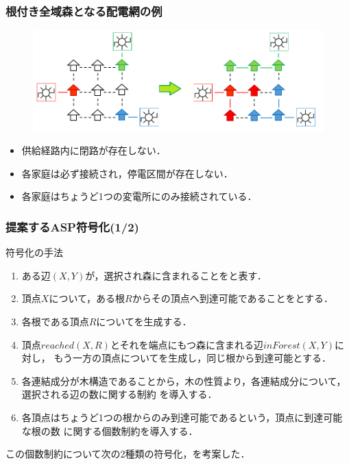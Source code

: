\documentclass[dvipdfmx,11pt]{beamer}
\begin{document}
\begin{frame}\frametitle{根付き全域森となる配電網の例}

 \begin{figure}[h]
  \centering
  \includegraphics[scale=0.5]{network.png}
 \end{figure}

 \begin{exampleblock}{}
  \begin{itemize}
   \item 供給経路内に閉路が存在しない．
   \item 各家庭は必ず接続され，停電区間が存在しない．
   \item 各家庭はちょうど1つの変電所にのみ接続されている．
  \end{itemize}
 \end{exampleblock}
\end{frame}

\begin{frame}\frametitle{提案するASP符号化(1/2)}
 \begin{exampleblock}{符号化の手法}
  \begin{enumerate}
   \item  ある辺$(X,Y)$が，選択され森に含まれることをと表す．
   \item  頂点$X$について，ある根$R$からその頂点へ到達可能であることをとする．
   \item  各根である頂点$R$についてを生成する．
   \item  頂点$reached(X,R)$とそれを端点にもつ森に含まれる辺$inForest(X,Y)$に対し，
		  もう一方の頂点についてを生成し，同じ根から到達可能とする．
   \item  各連結成分が木構造であることから，木の性質より，各連結成分について，
		  選択される\alert{辺の数に関する制約} を導入する．
   \item  各頂点はちょうど1つの根からのみ到達可能であるという，頂点に到達可能な\alert{根の数
		  に関する個数制約}を導入する．
  \end{enumerate}
 \end{exampleblock}
 この個数制約について次の2種類の符号化，を考案した．

\end{frame}
\end{document}
